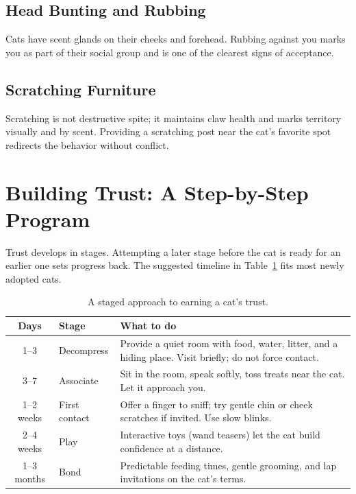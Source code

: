 \documentclass[12pt,a4paper]{article}
\begin{document}
\subsection{Head Bunting and Rubbing}
Cats have scent glands on their cheeks and forehead. Rubbing against you marks you as
part of their social group and is one of the clearest signs of acceptance.

\subsection{Scratching Furniture}
Scratching is not destructive spite; it maintains claw health and marks territory
visually and by scent. Providing a scratching post near the cat's favorite spot
redirects the behavior without conflict.

\section{Building Trust: A Step-by-Step Program}
Trust develops in stages. Attempting a later stage before the cat is ready for an
earlier one sets progress back. The suggested timeline in Table~\ref{tab:trust}
fits most newly adopted cats.

\begin{table}[h]
\centering
\caption{A staged approach to earning a cat's trust.}
\label{tab:trust}
\begin{tabular}{@{}clp{8.5cm}@{}}
\toprule
\textbf{Days} & \textbf{Stage} & \textbf{What to do} \\
\midrule
1--3 & Decompress & Provide a quiet room with food, water, litter, and a hiding place. Visit briefly; do not force contact. \\
3--7 & Associate & Sit in the room, speak softly, toss treats near the cat. Let it approach you. \\
1--2 weeks & First contact & Offer a finger to sniff; try gentle chin or cheek scratches if invited. Use slow blinks. \\
2--4 weeks & Play & Interactive toys (wand teasers) let the cat build confidence at a distance. \\
1--3 months & Bond & Predictable feeding times, gentle grooming, and lap invitations on the cat's terms. \\
\bottomrule
\end{tabular}
\end{table}
\end{document}

